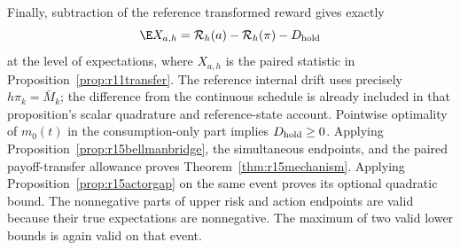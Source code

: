 Finally, subtraction of the reference transformed reward gives exactly
\[
 \E X_{a,h}=\mathcal R_h(a)-\mathcal R_h(\pi)-D_{\rm hold}
\]
at the level of expectations, where $X_{a,h}$ is the paired statistic
in Proposition~\ref{prop:r11transfer}. The reference internal drift
uses precisely $h\pi_k=\bar M_k$; the difference from the continuous
schedule is already included in that proposition's scalar quadrature
and reference-state account. Pointwise optimality of $m_0(t)$ in the
consumption-only part implies $D_{\rm hold}\geq0$. Applying
Proposition~\ref{prop:r15bellmanbridge}, the simultaneous endpoints,
and the paired payoff-transfer allowance proves
Theorem~\ref{thm:r15mechanism}. Applying
Proposition~\ref{prop:r15actorgap} on the same event proves its
optional quadratic bound. The nonnegative parts of upper risk and
action endpoints are valid because their true expectations are
nonnegative. The maximum of two valid lower bounds is again valid
on that event.
